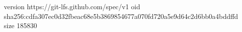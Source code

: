 version https://git-lfs.github.com/spec/v1
oid sha256:cdfa307ec0d32fbeac68e5b3869854677a070fd720a5e9d64c2d6bb0a4bddffd
size 185830
